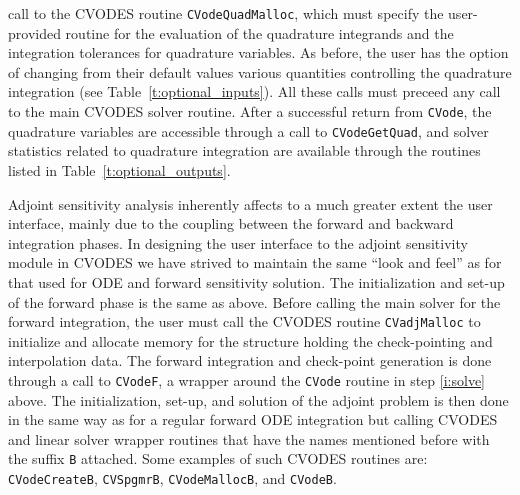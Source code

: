 call to the CVODES routine {\tt CVodeQuadMalloc}, which must specify the
user-provided routine for the evaluation of the quadrature integrands and
the integration tolerances for quadrature variables. As before, the user
has the option of changing from their default values various quantities
controlling the quadrature integration (see Table~\ref{t:optional_inputs}).
All these calls must preceed any call to the main CVODES solver routine.
After a successful return from {\tt CVode}, the quadrature variables are
accessible through a call to {\tt CVodeGetQuad}, and solver statistics related
to quadrature integration are available through the routines listed in
Table~\ref{t:optional_outputs}.

%
Adjoint sensitivity analysis inherently affects to a much greater extent the 
user interface, mainly due to the coupling between the forward and backward 
integration phases. 
%
In designing the user interface to the adjoint sensitivity module in CVODES we 
have strived to maintain the same ``look and feel'' as for that used for
ODE and forward sensitivity solution.
The initialization and set-up of the forward phase is the same as above.
Before calling the main solver for the forward integration, the user must 
call the CVODES routine {\tt CVadjMalloc} to initialize and allocate memory 
for the structure holding the check-pointing and interpolation data.
The forward integration and check-point generation is done through a call
to {\tt CVodeF}, a wrapper around the {\tt CVode} routine in step 
\ref{i:solve} above.
%
The initialization, set-up, and solution of the adjoint problem is then
done in the same way as for a regular forward ODE integration but
calling CVODES and linear solver wrapper routines that have the names 
mentioned before with the suffix {\tt B} attached. Some examples of such
CVODES routines are: {\tt CVodeCreateB}, {\tt CVSpgmrB}, {\tt CVodeMallocB},
and {\tt CVodeB}.

